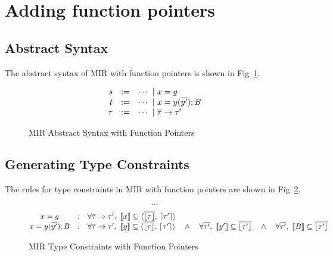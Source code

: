 \documentclass[peerreview, 10pt]{IEEEtran}
\newcommand{\cons}[1]{\ensuremath{\llbracket#1\rrbracket}}
\newcommand{\consp}[2]{\ensuremath{\langle#1,\,#2\rangle}}
\newcommand{\floor}[1]{\ensuremath{\lfloor#1\rfloor}}
\newcommand{\ceil}[1]{\ensuremath{\lceil#1\rceil}}
\newcommand{\ifrule}[2]{\ensuremath{#1&:&#2}}
\begin{document}
\section{Adding function pointers}

\subsection{Abstract Syntax}
The abstract syntax of MIR with function pointers is shown in Fig~\ref{fig:mir-funcptrs-absyn}.
\begin{figure}[ht]
\centering
\begin{framed}
\[
  \begin{array}{@{}rcl@{}}
    s &:=& \cdots\ |\ x=g \\
    t &:=& \cdots\ |\ x=y(\overline{y'}); B \\
    \tau &:=& \cdots\ |\ \overline{\tau}\rightarrow\tau' \\
  \end{array}
\]
\end{framed}
\caption{MIR Abstract Syntax with Function Pointers}
\label{fig:mir-funcptrs-absyn}
\end{figure}

\subsection {Generating Type Constraints}

The rules for type constraints in MIR with function pointers are shown in Fig~\ref{fig:mir-funcptrs-type-constraints}.

\begin{figure}[ht]
\begin{framed}
\[\cdots\]
\[\begin{array}{@{}ccl@{}}
  \ifrule{x=g}{\forall \overline{\tau}\rightarrow\tau',\ \cons{x}\subseteq\consp{\overline{\floor{\tau}}}{\ceil{\tau'}}}\\
  \ifrule{x=y(\overline{y'}); B}{\forall \overline{\tau}\rightarrow\tau',\ \cons{y}\subseteq\consp{\overline{\floor{\tau}}}{\ceil{\tau'}}\quad\land\quad \forall \overline{\tau'},\ \cons{y'}\subseteq\overline{\floor{\tau'}}\quad\land\quad \forall \overline{\tau'},\ \cons{B}\subseteq\overline{\floor{\tau'}}}
\end{array}\]
\end{framed}
\caption{MIR Type Constraints with Function Pointers}
\label{fig:mir-funcptrs-type-constraints}
\end{figure}
\end{document}
